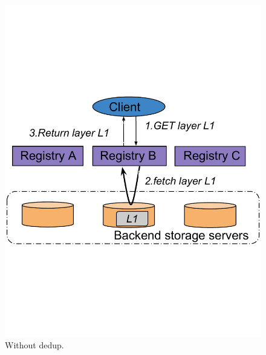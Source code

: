 \begin{figure}[t]
	\centering
		\begin{minipage}{0.225\textwidth}
			\centering
			\includegraphics[width=1\textwidth]{graphs/nodedup.pdf}
			\caption{Without dedup.}
			\label{fig:without-dedup}
		\end{minipage}
	\begin{minipage}{0.225\textwidth}
		\centering

\end{minipage}
\end{figure}
